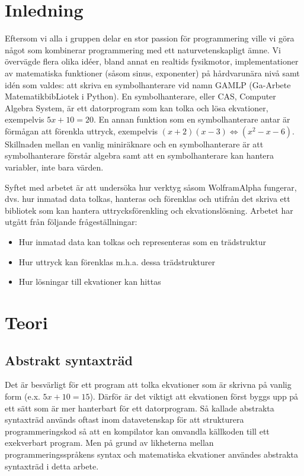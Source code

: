 \documentclass[12pt,a4paper]{article}
\begin{document}
\section{Inledning}
Eftersom vi alla i gruppen delar en stor passion för programmering ville vi göra något som kombinerar programmering med ett naturvetenskapligt ämne. Vi övervägde flera olika idéer, bland annat en realtids fysikmotor, implementationer av matematiska funktioner (såsom sinus, exponenter) på hårdvarunära nivå samt idén som valdes: att skriva en symbolhanterare vid namn GAMLP (Ga-Arbete MatematikbibLiotek i Python). En symbolhanterare, eller CAS, Computer Algebra System, är ett datorprogram som kan tolka och lösa ekvationer, exempelvis \(5x + 10 = 20\). En annan funktion som en symbolhanterare antar är förmågan att förenkla uttryck, exempelvis \((x + 2)(x - 3) \Leftrightarrow (x^{2} - x - 6)\). Skillnaden mellan en vanlig miniräknare och en symbolhanterare är att symbolhanterare förstår algebra samt att en symbolhanterare kan hantera variabler, inte bara värden. 
\par
Syftet med arbetet är att undersöka hur verktyg såsom WolframAlpha fungerar, dvs. hur inmatad data tolkas, hanteras och förenklas och utifrån det skriva ett bibliotek som kan hantera uttrycksförenkling och ekvationslösning. Arbetet har utgått från följande frågeställningar:
\begin{itemize}
	\item Hur inmatad data kan tolkas och representeras som en trädstruktur
	\item Hur uttryck kan förenklas m.h.a. dessa trädstrukturer
	\item Hur lösningar till ekvationer kan hittas
\end{itemize}
\section{Teori}
\subsection{Abstrakt syntaxträd}
Det är besvärligt för ett program att tolka ekvationer som är skrivna på vanlig form (e.x. \(5x + 10 = 15\)). Därför är det viktigt att ekvationen först byggs upp på ett sätt som är mer hanterbart för ett datorprogram. Så kallade abstrakta syntaxträd används oftast inom datavetenskap för att strukturera programmeringskod så att en kompilator kan omvandla källkoden till ett exekverbart program. Men på grund av likheterna mellan programmeringsspråkens syntax och matematiska ekvationer användes abstrakta syntaxträd i detta arbete.
\end{document}
